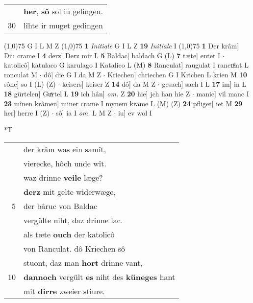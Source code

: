 \documentclass[8pt,a4paper,notitlepage]{article}
\begin{document}
\begin{table}[ht]
\begin{minipage}[t]{0.5\linewidth}
\begin{tabular}{rl}
 & \textbf{her}, \textbf{sô} sol iu gelingen.\\ 
30 & lîhte ir muget gedingen\\ 
\end{tabular}
\scriptsize
\line(1,0){75} \newline
G I L M Z \newline
\line(1,0){75} \newline
\textbf{1} \textit{Initiale} G I L Z  \textbf{19} \textit{Initiale} I  \newline
\line(1,0){75} \newline
\textbf{1} Der krâm] Diu crame I \textbf{4} derz] Derz mir L \textbf{5} Baldac] baldach G (L) \textbf{7} tæte] entet I  $\cdot$ katolicô] katulaco G karulago I Katalico L (M) \textbf{8} Ranculat] raugulat I rancuͯlat L ronculat M  $\cdot$ dô] die G I da M Z  $\cdot$ Kriechen] chriechen G I Krichen L krien M \textbf{10} sône] so I (L) (Z)  $\cdot$ keisers] keiser Z \textbf{14} dô] da M Z  $\cdot$ gesach] sach I L \textbf{17} im] in L \textbf{18} gürtelen] Guͯrtel L \textbf{19} ich hân] \textit{om.} Z \textbf{20} hie] jch han hie Z  $\cdot$ manic] vil manc I \textbf{23} mînen krâmen] miner crame I mynem krame L (M) (Z) \textbf{24} pfliget] iet M \textbf{29} her] herre I (Z)  $\cdot$ sô] ia I \textit{om.} L M Z  $\cdot$ iu] ev wol I \newline
\end{minipage}
\hspace{0.5cm}
\begin{minipage}[t]{0.5\linewidth}
\small
\begin{center}*T
\end{center}
\begin{tabular}{rl}
 & der krâm was ein samît,\\ 
 & vierecke, hôch unde wît.\\ 
 & waz drinne \textbf{veile} læge?\\ 
 & \textbf{derz} mit gelte widerwæge,\\ 
5 & der bâruc von Baldac\\ 
 & vergülte niht, daz drinne lac.\\ 
 & als tæte \textbf{ouch} der katolicô\\ 
 & von Ranculat. dô Kriechen sô\\ 
 & stuont, daz man \textbf{hort} drinne vant,\\ 
10 & \textbf{dannoch} vergült \textbf{es} niht des \textbf{küneges} hant\\ 
 & mit \textbf{dirre} zweier stiure.\\ 

\end{tabular}
\end{minipage}
\end{table}
\end{document}
